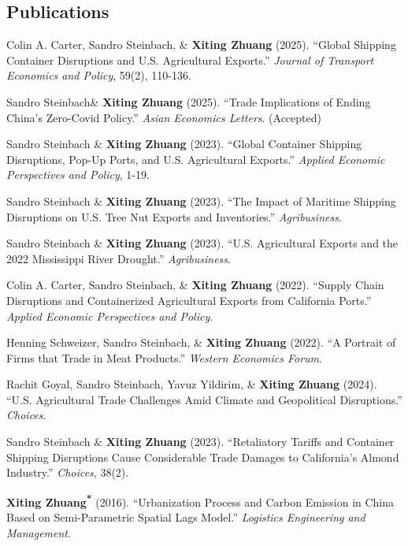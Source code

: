 \documentclass[10.5pt,letterpaper]{article}
\newcommand{\corrauthor}{\textsuperscript{*}}
\renewenvironment{itemize}{
	\begin{list}{}{
			\setlength{\leftmargin}{1.5em}
		}
	}{
	\end{list}
}
\begin{document}
	\subsection*{\textbf{Publications}}
	\begin{itemize}
		\item[-] Colin A. Carter, Sandro Steinbach, \& \textbf{Xiting Zhuang} (2025).  
		``Global Shipping Container Disruptions and U.S. Agricultural Exports.''  
		\textit{Journal of Transport Economics and Policy}, 59(2), 110-136.  
		
		\item[-] Sandro Steinbach\& \textbf{Xiting Zhuang} (2025).  
		``Trade Implications of Ending China’s Zero-Covid Policy.''  
		\textit{Asian Economics Letters}. (Accepted)
		
		\item[-] Sandro Steinbach \& \textbf{Xiting Zhuang} (2023).  
		``Global Container Shipping Disruptions, Pop-Up Ports, and U.S. Agricultural Exports.''  
		\textit{Applied Economic Perspectives and Policy}, 1-19.
		
		\item[-] Sandro Steinbach  \& \textbf{Xiting Zhuang} (2023).  
		``The Impact of Maritime Shipping Disruptions on U.S. Tree Nut Exports and Inventories.''  
		\textit{Agribusiness}.
		
		\item[-] Sandro Steinbach \& \textbf{Xiting Zhuang} (2023).  
		``U.S. Agricultural Exports and the 2022 Mississippi River Drought.''  
		\textit{Agribusiness}.
		
		\item[-] Colin A. Carter, Sandro Steinbach, \& \textbf{Xiting Zhuang} (2022).  
		``Supply Chain Disruptions and Containerized Agricultural Exports from California Ports.''  
		\textit{Applied Economic Perspectives and Policy}.
		
		\item[-] Henning Schweizer, Sandro Steinbach, \& \textbf{Xiting Zhuang} (2022).  
		``A Portrait of Firms that Trade in Meat Products.''  
		\textit{Western Economics Forum}.
		
		\item[-] Rachit Goyal, Sandro Steinbach, Yavuz Yildirim, \& \textbf{Xiting Zhuang} (2024).  
		``U.S. Agricultural Trade Challenges Amid Climate and Geopolitical Disruptions.''  
		\textit{Choices}.
		
		\item[-] Sandro Steinbach \& \textbf{Xiting Zhuang} (2023).  
		``Retaliatory Tariffs and Container Shipping Disruptions Cause Considerable Trade Damages to California’s Almond Industry.''  
		\textit{Choices}, 38(2).
		
		\item[-] \textbf{Xiting Zhuang\corrauthor} (2016).  
		``Urbanization Process and Carbon Emission in China Based on Semi-Parametric Spatial Lags Model.''  
		\textit{Logistics Engineering and Management}.
	\end{itemize}
	
\end{document}
